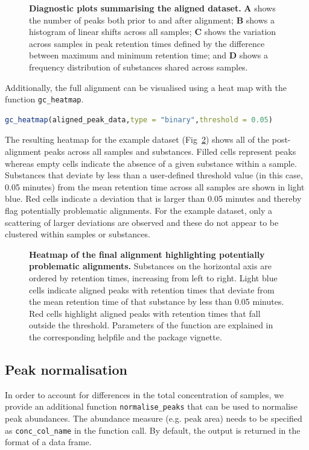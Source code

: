 \documentclass[10pt,letterpaper]{article}
\begin{document}
\begin{figure}[htbp]
\centering
\caption{\textbf{Diagnostic plots summarising the aligned dataset.}
\textbf{A} shows the number of peaks both prior to and after alignment; \textbf{B} shows a histogram of linear shifts across all samples; \textbf{C} shows the variation across samples in peak retention times defined by the difference between maximum and minimum retention time; and \textbf{D} shows a frequency distribution of substances shared across samples.}
\label{Fig:Fig3}
\end{figure} 

Additionally, the full alignment can be visualised using a heat map with the function \texttt{gc\_heatmap}.

\begin{lstlisting}[language=R]
gc_heatmap(aligned_peak_data,type = "binary",threshold = 0.05)
\end{lstlisting}

The resulting heatmap for the example dataset (Fig~\ref{Fig:Fig4}) shows all of the post-alignment peaks across all samples and substances.  Filled cells represent peaks whereas empty cells indicate the absence of a given substance within a sample. Substances that deviate by less than a user-defined threshold value (in this case, 0.05 minutes) from the mean retention time across all samples are shown in light blue. Red cells indicate a deviation that is larger than 0.05 minutes and thereby flag potentially problematic alignments. For the example dataset, only a scattering of larger deviations are observed and these do not appear to be clustered within samples or substances.

\begin{figure}[htbp]
\centering
\caption{\textbf{Heatmap of the final alignment highlighting potentially problematic alignments.} 
Substances on the horizontal axis are ordered by retention times, increasing from left to right. Light blue cells indicate aligned peaks with retention times that deviate from the mean retention time of that substance by less than 0.05 minutes.  Red cells highlight aligned peaks with retention times that fall outside the threshold. Parameters of the function are explained in the corresponding helpfile and the package vignette.}
\label{Fig:Fig4}
\end{figure} 

\subsection*{Peak normalisation}
In order to account for differences in the total concentration of samples, we provide an additional function \texttt{normalise\_peaks} that can be used to normalise peak abundances. The abundance measure (e.g. peak area) needs to be specified as \texttt{conc\_col\_name} in the function call. By default, the output is returned in the format of a data frame. 
\end{document}
